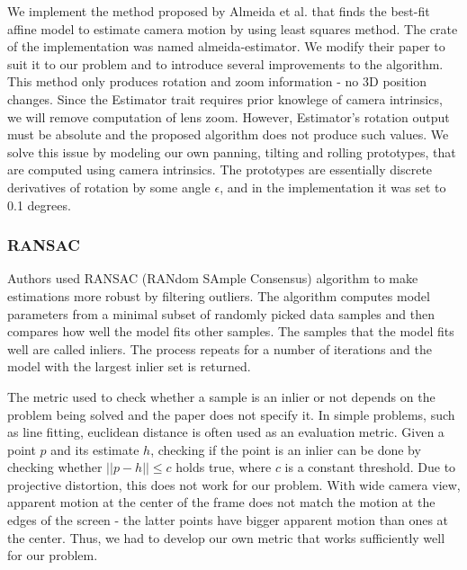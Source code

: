 \documentclass[11pt,english]{report}
\begin{document}
We implement the method proposed by Almeida et al. that finds the best-fit affine model to estimate camera motion by using least squares method\cite{almeida}. The crate of the implementation was named almeida-estimator. We modify their paper to suit it to our problem and to introduce several improvements to the algorithm. This method only produces rotation and zoom information - no 3D position changes. Since the Estimator trait requires prior knowlege of camera intrinsics, we will remove computation of lens zoom. However, Estimator's rotation output must be absolute and the proposed algorithm does not produce such values. We solve this issue by modeling our own panning, tilting and rolling prototypes, that are computed using camera intrinsics. The prototypes are essentially discrete derivatives of rotation by some angle $\epsilon$, and in the implementation it was set to 0.1 degrees.

\subsubsection{RANSAC}

Authors used RANSAC\cite{FISCHLER1987726} (RANdom SAmple Consensus) algorithm to make estimations more robust by filtering outliers. The algorithm computes model parameters from a minimal subset of randomly picked data samples and then compares how well the model fits other samples. The samples that the model fits well are called inliers. The process repeats for a number of iterations and the model with the largest inlier set is returned.

The metric used to check whether a sample is an inlier or not depends on the problem being solved and the paper does not specify it. In simple problems, such as line fitting, euclidean distance is often used as an evaluation metric. Given a point $p$ and its estimate $h$, checking if the point is an inlier can be done by checking whether $||p - h|| \leq c$ holds true, where $c$ is a constant threshold. Due to projective distortion, this does not work for our problem. With wide camera view, apparent motion at the center of the frame does not match the motion at the edges of the screen - the latter points have bigger apparent motion than ones at the center. Thus, we had to develop our own metric that works sufficiently well for our problem.
\end{document}
